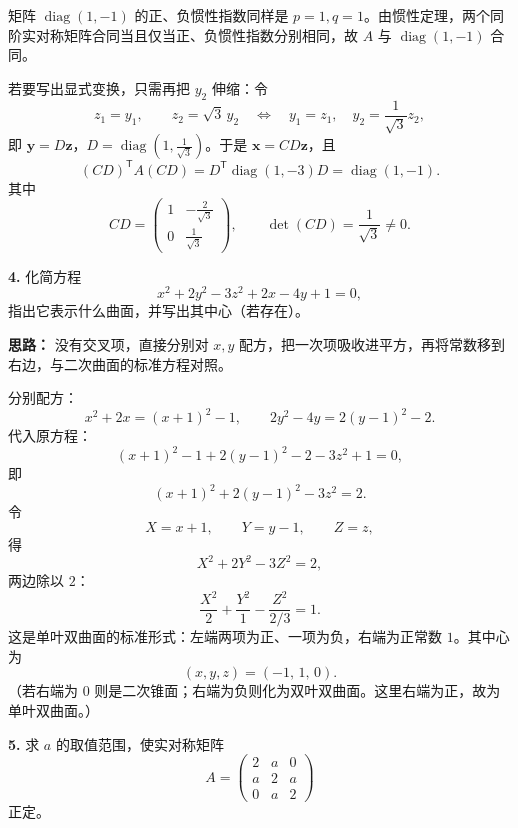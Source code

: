 矩阵 \(\operatorname{diag}(1,-1)\) 的正、负惯性指数同样是 \(p=1,q=1\)。由惯性定理，两个同阶实对称矩阵合同当且仅当正、负惯性指数分别相同，故 \(A\) 与 \(\operatorname{diag}(1,-1)\) 合同。

若要写出显式变换，只需再把 \(y_2\) 伸缩：令
\[
z_1=y_1,\qquad z_2=\sqrt3\,y_2
\quad\Longleftrightarrow\quad
y_1=z_1,\quad y_2=\frac1{\sqrt3}z_2,
\]
即 \(\mathbf{y}=D\mathbf{z}\)，\(D=\operatorname{diag}\!\left(1,\frac1{\sqrt3}\right)\)。于是 \(\mathbf{x}=CD\mathbf{z}\)，且
\[
(CD)^{\mathsf T}A(CD)
=D^{\mathsf T}\operatorname{diag}(1,-3)D
=\operatorname{diag}(1,-1).
\]
其中
\[
CD=\begin{pmatrix}1&-\frac{2}{\sqrt3}\\[2pt]0&\frac1{\sqrt3}\end{pmatrix},
\qquad \det(CD)=\frac1{\sqrt3}\neq0.
\]

\else \answerarea[10] \fi%

\textbf{4.} 化简方程
\[
x^2+2y^2-3z^2+2x-4y+1=0,
\]
指出它表示什么曲面，并写出其中心（若存在）。

\ifshowsolutions%

\textbf{思路：} 没有交叉项，直接分别对 \(x,y\) 配方，把一次项吸收进平方，再将常数移到右边，与二次曲面的标准方程对照。

分别配方：
\[
x^2+2x=(x+1)^2-1,\qquad
2y^2-4y=2(y-1)^2-2.
\]
代入原方程：
\[
(x+1)^2-1+2(y-1)^2-2-3z^2+1=0,
\]
即
\[
(x+1)^2+2(y-1)^2-3z^2=2.
\]
令
\[
X=x+1,\qquad Y=y-1,\qquad Z=z,
\]
得
\[
X^2+2Y^2-3Z^2=2,
\]
两边除以 \(2\)：
\[
\frac{X^2}{2}+\frac{Y^2}{1}-\frac{Z^2}{2/3}=1.
\]
这是单叶双曲面的标准形式：左端两项为正、一项为负，右端为正常数 \(1\)。其中心为
\[
(x,y,z)=(-1,\,1,\,0).
\]
（若右端为 \(0\) 则是二次锥面；右端为负则化为双叶双曲面。这里右端为正，故为单叶双曲面。）

\else \answerarea[8] \fi%

\textbf{5.} 求 \(a\) 的取值范围，使实对称矩阵
\[
A=\begin{pmatrix}
2&a&0\\
a&2&a\\
0&a&2
\end{pmatrix}
\]
正定。

